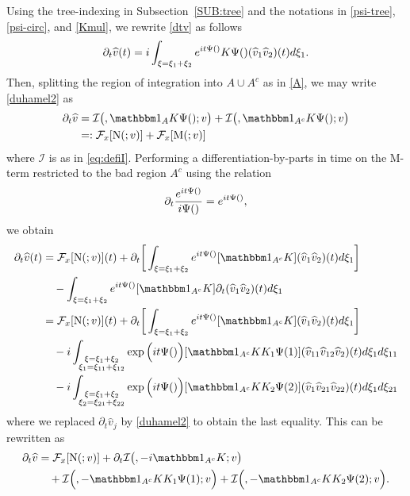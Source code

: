 \documentclass[a4paper,
11pt,  reqno]{amsart}
\makeatletter
\newcommand{\5}{\textup{V}}
\newcommand{\ft}{\widehat}
\newcommand{\ind}{\mathbbm 1}
\newcommand{\dt}{\partial_t}
\theoremstyle{remark}
\newcommand{\Ft}{{\mathcal{F}}}
\def\<#1>{\csname MH@symb@#1\endcsname}
\newcommand{\Ical}{\mathcal{I}}
\numberwithin{equation}{section}
\numberwithin{theorem}{section}
\newcommand{\MM}{\mathrm{M}}
\newcommand{\NN}{\mathrm{N}}
\makeatother
\begin{document}
Using the tree-indexing in Subsection~\ref{SUB:tree} and the notations in \eqref{psi-tree}, \eqref{psi-circ}, and \eqref{Kmul}, we rewrite \eqref{dtv} as follows
\begin{align}
\label{duhamel2}
\dt\ft v(t) =  i \int_{\xi = \xi_1 + \xi_2} e^{it \Psi(\<1>)}  K \Psi(\<1>)   (\widehat{v}_{1} \widehat{v}_{2}) (t)
d\xi_{1}.
\end{align}
Then, splitting the region of integration into $A\cup A^c$ as in \eqref{A}, we may write \eqref{duhamel2} as 
\begin{align}
\dt\ft v
&
= 
\Ical\big( \<1>, \ind_A K \Psi(\<1>); v 
\big)
+ \Ical\big( \<1>, \ind_{A^c} K \Psi(\<1>) ;v 
\big)
\\
&
=: \Ft_x[ \NN ( \<1>; v )] + \Ft_x[ \MM(\<1>; v) ] 
\label{NFE000}
\end{align}
where $\Ical$ is as in \eqref{eq:defiI}. Performing a differentiation-by-parts in time on the $\MM$-term restricted to the bad region $A^c$ using the relation
$$
\dt\frac{e^{it\Psi(\<1>)}}{i\Psi(\<1>)}=e^{it\Psi(\<1>)},
$$ 
we obtain
\begin{align}
\label{NFE01}
\begin{split}
\dt\ft v(t)  
&=
\Ft_x[ \NN ( \<1>; v )] (t)
+ \dt\bigg[ \int_{\xi = \xi_1 + \xi_2} e^{it \Psi(\<1>)} 
[\ind_{A^c}
 K ] 
(\ft v_{1} \ft v_{2} )(t)
d\xi_{1} 
\bigg]
\\
&
\quad 
-
   \int_{\xi = \xi_1 + \xi_2} e^{it \Psi(\<1>)} 
[ \ind_{A^c} K ]
\partial_{t} (\ft v_{1} \ft v_{2} )(t)
d\xi_{1} 
\\
& =
\Ft_x[ \NN ( \<1>; v )] (t)
+  \dt\bigg[ \int_{\xi = \xi_1 + \xi_2} e^{it \Psi(\<1>)} 
[\ind_{A^c}
 K ] 
(\ft v_{1} \ft v_{2} )(t)
d\xi_{1} 
\bigg]
\\
&
\quad 
- i
 \int_{\substack{\xi = \xi_1 + \xi_2 \\ \xi_1 = \xi_{11}+ \xi_{12}  }} \exp\Big(it \Psi(\<21>) \Big)
[ \ind_{A^c} K K_1 \Psi(1) ]
 (\ft v_{11} \ft v_{12} \ft v_2 )(t)
d\xi_{1} d\xi_{11} 
\\
&
\quad 
-i  \int_{\substack{\xi = \xi_1 + \xi_2 \\ \xi_2 = \xi_{21}+ \xi_{22}  }} \exp\Big(it \Psi(\<22>) \Big)
[ \ind_{A^c} K K_2 \Psi(2) ]
 (\ft v_{1} \ft v_{21} \ft v_{22} )(t)
d\xi_{1} d\xi_{21}
\end{split}
\end{align}
where we replaced $\dt \ft v_j$ by \eqref{duhamel2} to obtain the last equality. This can be rewritten as
\begin{align}
\label{NFE00}
\begin{split}
\dt\ft v 
&
=
 \Ft_x[ \NN ( \<1>; v )] 
+ 
\dt\Ical \big( \<1>,  - i \ind_{A^c} K; v \big) 
\\
&
\quad 
+
\Ical \Big( \<21>, - \ind_{A^c} KK_1\Psi(1) ; v  \Big) 
+
\Ical \Big( \<22>, - \ind_{A^c} KK_2\Psi(2) ; v  \Big) 
. 
\end{split}
\end{align}
\end{document}
